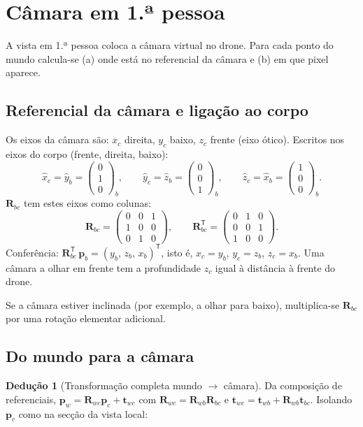 \documentclass[11pt,a4paper]{article}
\newcommand{\vv}[1]{\mathbf{#1}}              %
\newcommand{\col}[3]{\begin{pmatrix}#1\\#2\\#3\end{pmatrix}}
\newcommand{\Rot}{\mathbf{R}}
\newcommand{\T}{^{\mathsf{T}}}
\theoremstyle{definition}
\newtheorem{deducao}{Dedução}[section]
\newcommand{\resultado}[1]{\begin{center}\fbox{\parbox{0.9\textwidth}{\centering #1}}\end{center}}
\begin{document}
\section{Câmara em 1.ª pessoa}
A vista em 1.ª pessoa coloca a câmara virtual no drone. Para cada ponto do mundo calcula-se (a) onde está no referencial da câmara e (b) em que pixel aparece.

\subsection{Referencial da câmara e ligação ao corpo}
Os eixos da câmara são: $x_c$ direita, $y_c$ baixo, $z_c$ frente (eixo ótico). Escritos nos eixos do corpo (frente, direita, baixo):
\[
\hat{x}_c=\hat{y}_b=\col{0}{1}{0}_b,\qquad
\hat{y}_c=\hat{z}_b=\col{0}{0}{1}_b,\qquad
\hat{z}_c=\hat{x}_b=\col{1}{0}{0}_b .
\]
$\Rot_{bc}$ tem estes eixos como colunas:
\[
\Rot_{bc}=\begin{pmatrix}0&0&1\\1&0&0\\0&1&0\end{pmatrix},\qquad
\Rot_{bc}\T=\begin{pmatrix}0&1&0\\0&0&1\\1&0&0\end{pmatrix}.
\]
Conferência: $\Rot_{bc}\T\,\vv{p}_b=(y_b,\,z_b,\,x_b)\T$, isto é, $x_c=y_b$, $y_c=z_b$, $z_c=x_b$. Uma câmara a olhar em frente tem a profundidade $z_c$ igual à distância à frente do drone.

Se a câmara estiver inclinada (por exemplo, a olhar para baixo), multiplica-se $\Rot_{bc}$ por uma rotação elementar adicional.

\subsection{Do mundo para a câmara}
\begin{deducao}[Transformação completa mundo $\to$ câmara]
Da composição de referenciais, $\vv{p}_w=\Rot_{wc}\vv{p}_c+\vv{t}_{wc}$ com $\Rot_{wc}=\Rot_{wb}\Rot_{bc}$ e $\vv{t}_{wc}=\vv{t}_{wb}+\Rot_{wb}\vv{t}_{bc}$. Isolando $\vv{p}_c$ como na secção da vista local:
\end{deducao}
\resultado{$\vv{p}_c=\Rot_{wc}\T\,(\vv{p}_w-\vv{t}_{wc})=\begin{pmatrix}x_c\\y_c\\z_c\end{pmatrix}$}
\end{document}
